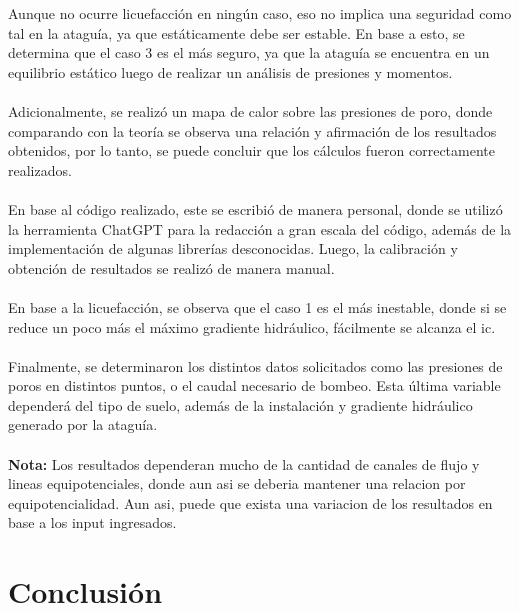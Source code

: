 Aunque no ocurre licuefacción en ningún caso, eso no implica una seguridad como tal en la ataguía, ya que estáticamente debe ser estable. En base a esto, se determina que el caso 3 es el más seguro, ya que la ataguía se encuentra en un equilibrio estático luego de realizar un análisis de presiones y momentos.
\\ \\
Adicionalmente, se realizó un mapa de calor sobre las presiones de poro, donde comparando con la teoría se observa una relación y afirmación de los resultados obtenidos, por lo tanto, se puede concluir que los cálculos fueron correctamente realizados.
\\ \\
En base al código realizado, este se escribió de manera personal, donde se utilizó la herramienta ChatGPT para la redacción a gran escala del código, además de la implementación de algunas librerías desconocidas. Luego, la calibración y obtención de resultados se realizó de manera manual.
\\ \\
En base a la licuefacción, se observa que el caso 1 es el más inestable, donde si se reduce un poco más el máximo gradiente hidráulico, fácilmente se alcanza el ic.
\\ \\
Finalmente, se determinaron los distintos datos solicitados como las presiones de poros en distintos puntos, o el caudal necesario de bombeo. Esta última variable dependerá del tipo de suelo, además de la instalación y gradiente hidráulico generado por la ataguía.
\\ \\
\textbf{Nota:} Los resultados dependeran mucho de la cantidad de canales de flujo y lineas equipotenciales, donde aun asi se deberia mantener una relacion por equipotencialidad. Aun asi, puede que exista una variacion de los resultados en base a los input ingresados.

\section{Conclusión}

